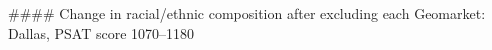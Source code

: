 #### Change in racial/ethnic composition after excluding each Geomarket: Dallas, PSAT score 1070–1180

